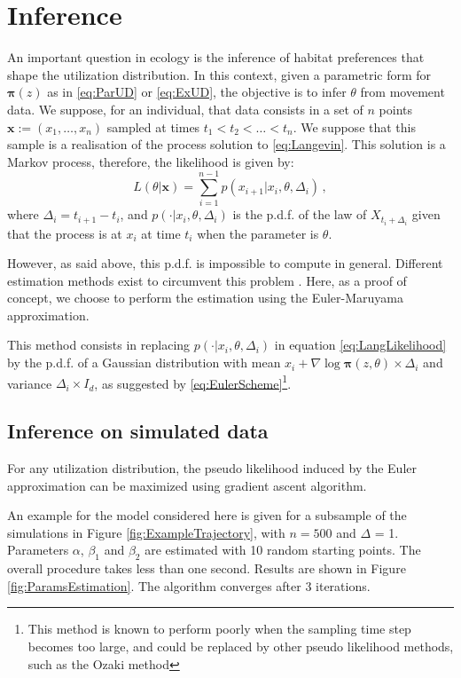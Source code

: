 \documentclass[10pt,a4paper]{article}
\newcommand{\ud}{\boldsymbol{\pi}}
\begin{document}
\section{Inference}
\label{sec:inference}
An important question in ecology is the inference of habitat preferences that shape the utilization distribution. In this context, given a parametric form for $\ud(z)$ as in \eqref{eq:ParUD} or \eqref{eq:ExUD}, the objective is to infer $\theta$ from movement data. We suppose, for an individual, that data consists in a set of $n$ points $\mathbf{x} :=(x_1, \dots, x_n)$ sampled at times $t_1< t_2<\dots < t_n$. We suppose that this sample is a realisation of the process solution to \eqref{eq:Langevin}. This solution is a Markov process, therefore, the  likelihood is given by:
\begin{equation}
\label{eq:LangLikelihood}
L(\theta\vert \mathbf{x}) = \sum_{i = 1}^{n - 1} p(x_{i+1}\vert x_i, \theta, \Delta_i)\,,
\end{equation}
where $\Delta_i = t_{i+1} - t_i$, and  $p(\cdot\vert x_i, \theta, \Delta_i)$ is the p.d.f. of the law of $X_{t_i + \Delta_i}$ given that the process is at $x_i$ at time $t_i$ when the parameter is $\theta$. 

However, as said above, this p.d.f. is impossible to compute in general. Different estimation methods exist to circumvent this problem \citep{gloaguen2017stochastic}. Here, as a proof of concept, we choose to perform the estimation using the Euler-Maruyama approximation. 

This method consists in replacing $p(\cdot\vert x_i, \theta, \Delta_i)$ in equation \eqref{eq:LangLikelihood} by the p.d.f. of a Gaussian distribution with mean $x_i + \nabla \log \ud(z, \theta)\times \Delta_i$ and variance $\Delta_i \times I_d$, as suggested by \eqref{eq:EulerScheme}\footnote{This method is known to perform poorly when the sampling time step becomes too large, and could be replaced by other pseudo likelihood methods, such as the Ozaki method}.
\subsection{Inference on simulated data}
For any utilization distribution, the pseudo likelihood induced by the Euler approximation can be maximized using gradient ascent algorithm. 

An example for the model considered here is given for a subsample of the simulations in Figure \ref{fig:ExampleTrajectory}, with $n = 500$ and $\Delta$ = 1. Parameters $\alpha$, $\beta_1$ and $\beta_2$ are estimated with 10 random starting points. The overall procedure takes less than one second. Results are shown in Figure \ref{fig:ParamsEstimation}. The algorithm converges after 3 iterations. 
\end{document}
